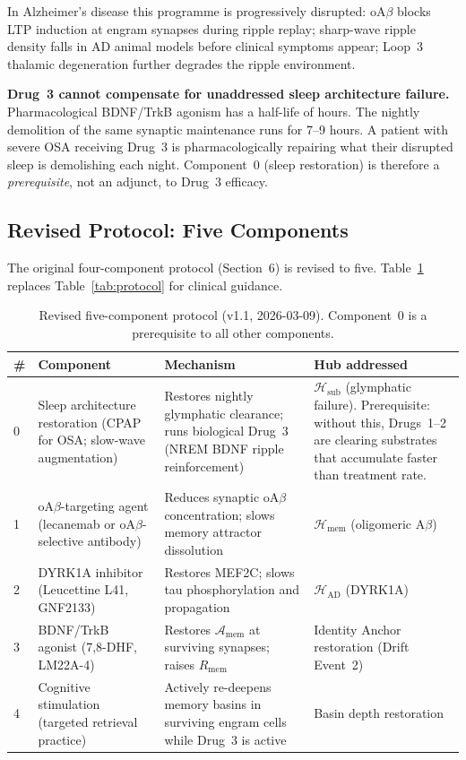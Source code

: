 \documentclass[12pt,a4paper]{article}
\newenvironment{warnenv}{%
  \begin{tcolorbox}[colback=red!5,colframe=warnbox,boxrule=1pt,
    arc=3pt,left=8pt,right=8pt,top=6pt,bottom=6pt,breakable]}{%
  \end{tcolorbox}}
\newcommand{\RMEM}{R_{\mathrm{mem}}}
\newcommand{\IA}{\mathcal{A}}
\begin{document}
In Alzheimer's disease this programme is progressively
disrupted: oA$\beta$ blocks LTP induction at engram
synapses during ripple replay; sharp-wave ripple
density falls in AD animal models before clinical
symptoms appear; Loop~3 thalamic degeneration
further degrades the ripple environment.

\begin{warnenv}
\textbf{Drug~3 cannot compensate for unaddressed
sleep architecture failure.} Pharmacological
BDNF/TrkB agonism has a half-life of hours. The
nightly demolition of the same synaptic maintenance
runs for 7--9 hours. A patient with severe OSA
receiving Drug~3 is pharmacologically repairing
what their disrupted sleep is demolishing each night.
Component~0 (sleep restoration) is therefore a
\emph{prerequisite}, not an adjunct, to Drug~3
efficacy.
\end{warnenv}

\subsection{Revised Protocol: Five Components}

The original four-component protocol (Section~6) is
revised to five. Table~\ref{tab:protocol_v2} replaces
Table~\ref{tab:protocol} for clinical guidance.

\begin{table}[ht!]
\centering
\caption{Revised five-component protocol
  (v1.1, 2026-03-09). Component~0 is a prerequisite
  to all other components.}
\label{tab:protocol_v2}
\begin{tabular}{p{0.4cm}p{2.8cm}p{4.0cm}p{4.6cm}}
\toprule
\textbf{\#} &
\textbf{Component} &
\textbf{Mechanism} &
\textbf{Hub addressed} \\
\midrule
0 &
Sleep architecture restoration
(CPAP for OSA; slow-wave
augmentation) &
Restores nightly glymphatic
clearance; runs biological
Drug~3 (NREM BDNF ripple
reinforcement) &
$\mathcal{H}_{\mathrm{sub}}$
(glymphatic failure).
Prerequisite: without this,
Drugs~1--2 are clearing
substrates that accumulate
faster than treatment rate. \\[6pt]
1 &
oA$\beta$-targeting agent
(lecanemab or
oA$\beta$-selective antibody) &
Reduces synaptic oA$\beta$
concentration; slows memory
attractor dissolution &
$\mathcal{H}_{\mathrm{mem}}$
(oligomeric A$\beta$) \\[6pt]
2 &
DYRK1A inhibitor
(Leucettine L41,
GNF2133) &
Restores MEF2C; slows tau
phosphorylation and
propagation &
$\mathcal{H}_{\mathrm{AD}}$
(DYRK1A) \\[6pt]
3 &
BDNF/TrkB agonist
(7,8-DHF, LM22A-4) &
Restores $\IA_{\mathrm{mem}}$
at surviving synapses; raises
$\RMEM$ &
Identity Anchor restoration
(Drift Event~2) \\[6pt]
4 &
Cognitive stimulation
(targeted retrieval practice) &
Actively re-deepens memory
basins in surviving engram
cells while Drug~3 is active &
Basin depth restoration \\
\bottomrule
\end{tabular}
\end{table}
\end{document}
